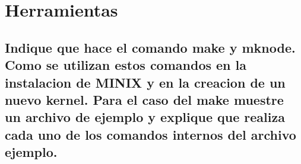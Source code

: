 \section{Herramientas}
\subsection{Indique que hace el comando make y mknode. Como se utilizan estos comandos en la instalacion de MINIX y en la creacion de un nuevo kernel. Para el caso del make muestre un archivo de ejemplo y explique que realiza cada uno de los comandos internos del archivo ejemplo.}

\vskip1cm

\falta